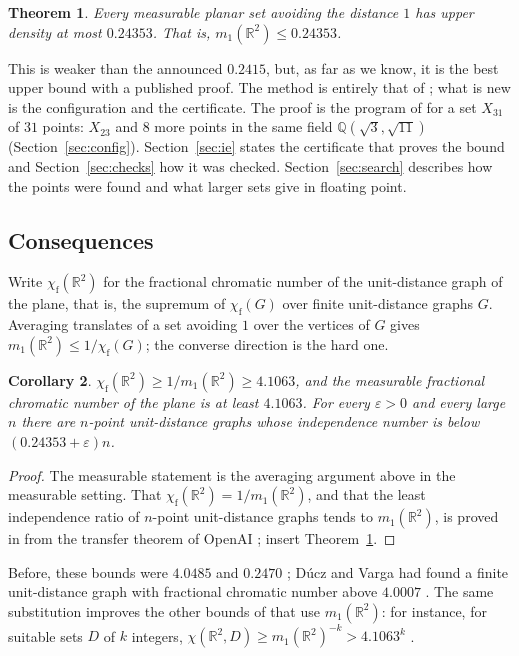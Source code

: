 \documentclass[11pt,a4paper]{amsart}
\newtheorem{theorem}{Theorem}
\newtheorem{corollary}[theorem]{Corollary}
\theoremstyle{remark}
\newcommand{\Q}{\mathbb{Q}}
\newcommand{\R}{\mathbb{R}}
\newcommand{\chif}{\chi_{\mathrm f}}
\newcommand{\NPTS}{31}
\newcommand{\NNEW}{8}
\newcommand{\MONE}{0.24353}
\newcommand{\INVM}{4.1063}
\begin{document}
\begin{theorem}\label{thm:main}
Every measurable planar set avoiding the distance $1$ has upper density at most $\MONE$. That is,
$m_1(\R^2)\le\MONE$.
\end{theorem}

This is weaker than the announced $0.2415$, but, as far as we know, it is the best upper bound with a published proof.
The method is entirely that of \cite{ACMVZ}; what is new is the configuration and the certificate. The proof is the
program of \cite{ACMVZ} for a set $X_{\NPTS}$ of $\NPTS$ points: $X_{23}$ and $\NNEW$ more points in
the same field $\Q(\sqrt3,\sqrt{11})$ (Section~\ref{sec:config}). Section~\ref{sec:ie} states the certificate that
proves the bound and Section~\ref{sec:checks} how it was checked. Section~\ref{sec:search} describes how the points were
found and what larger sets give in floating point.

\subsection*{Consequences}
Write $\chif(\R^2)$ for the fractional chromatic number of the unit-distance graph of the plane, that is, the supremum of
$\chif(G)$ over finite unit-distance graphs $G$. Averaging translates of a set avoiding $1$ over the vertices of $G$
gives $m_1(\R^2)\le1/\chif(G)$; the converse direction is the hard one.

\begin{corollary}\label{cor:frac}
$\chif(\R^2)\ge1/m_1(\R^2)\ge\INVM$, and the measurable fractional chromatic number of the plane is at least $\INVM$.
For every $\varepsilon>0$ and every large $n$ there are $n$-point unit-distance graphs whose independence number is
below $(\MONE+\varepsilon)n$.
\end{corollary}

\begin{proof}
The measurable statement is the averaging argument above in the measurable setting. That $\chif(\R^2)=1/m_1(\R^2)$, and
that the least independence ratio of $n$-point unit-distance graphs tends to $m_1(\R^2)$, is proved in
\cite[Cors.~2 and~3]{Galan} from the transfer theorem of OpenAI \cite[Thm.~2.3]{OpenAI}; insert
Theorem~\ref{thm:main}.
\end{proof}

Before, these bounds were $4.0485$ and $0.2470$ \cite{ACMVZ,Galan}; Dúcz and Varga had found a finite unit-distance
graph with fractional chromatic number above $4.0007$ \cite{DV}. The same substitution improves the other bounds of
\cite{Galan} that use $m_1(\R^2)$: for instance, for suitable sets $D$ of $k$ integers, $\chi(\R^2,D)\ge
m_1(\R^2)^{-k}>\INVM^k$ \cite[Cor.~6]{Galan}.
\end{document}
